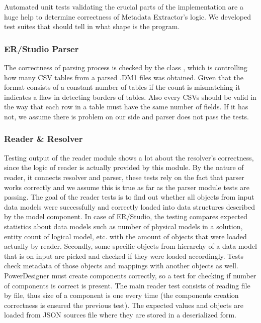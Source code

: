 Automated unit tests validating the crucial parts of the implementation are a huge help to determine correctness of Metadata Extractor's logic. 
We developed test suites that should tell in what shape is the program.

\subsubsection{ER/Studio Parser}

The correctness of parsing process is checked by the class , which is controlling how many CSV tables from a parsed .DM1 files was obtained. Given that the format consists of a constant number of tables if the count is mismatching it indicates a flaw in detecting borders of tables.
Also every CSVs should be valid in the way that each row in a table must have the same number of fields. If it has not, we assume there is problem on our side and parser does not pass the tests.

\subsubsection{Reader \& Resolver}

Testing output of the reader module shows a lot about the resolver's correctness, since the logic of reader is actually provided by this module. 
By the nature of reader, it connects resolver and parser, these tests rely on the fact that parser works correctly and we assume this is true as far as the parser module tests are passing.
The goal of the reader tests is to find out whether all objects from input data models were successfully and correctly loaded into data structures described by the model component.
In case of ER/Studio, the testing compares expected statistics about data models such as number of physical models in a solution, entity count of logical model, etc. with the amount of objects that were loaded actually by reader.
Secondly, some specific objects from hierarchy of a data model that is on input are picked and checked if they were loaded accordingly. Tests check metadata of those objects and mappings with another objects as well. \\ 

PowerDesigner must create components correctly, so a test for checking if number of components is correct is present.
The main reader test consists of reading file by file, thus size of a component is one every time (the components creation correctness is ensured the previous test).
The expected values and objects are loaded from JSON sources file where they are stored in a deserialized form.

